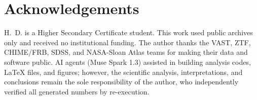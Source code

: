 \section*{Acknowledgements}
H.~D. is a Higher Secondary Certificate student. This work used public archives only and received no institutional funding. The author thanks the VAST, ZTF, CHIME/FRB, SDSS, and NASA-Sloan Atlas teams for making their data and software public. AI agents (Muse Spark 1.3) assisted in building analysis codes, LaTeX files, and figures; however, the scientific analysis, interpretations, and conclusions remain the sole responsibility of the author, who independently verified all generated numbers by re-execution.
